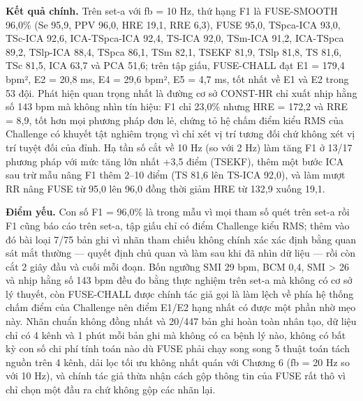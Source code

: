 \documentclass[12pt,a4paper]{article}
\begin{document}
\noindent \textbf{Kết quả chính.} Trên set-a với fb = 10 Hz, thứ hạng F1 là FUSE-SMOOTH 96,0\% (Se 95,9, PPV 96,0, HRE 19,1, RRE 6,3), FUSE 95,0, TSpca-ICA 93,0, TSc-ICA 92,6, ICA-TSpca-ICA 92,4, TS-ICA 92,0, TSm-ICA 91,2, ICA-TSpca 89,2, TSlp-ICA 88,4, TSpca 86,1, TSm 82,1, TSEKF 81,9, TSlp 81,8, TS 81,6, TSc 81,5, ICA 63,7 và PCA 51,6; trên tập giấu, FUSE-CHALL đạt E1 = 179,4 bpm², E2 = 20,8 ms, E4 = 29,6 bpm², E5 = 4,7 ms, tốt nhất về E1 và E2 trong 53 đội. Phát hiện quan trọng nhất là đường cơ sở CONST-HR chỉ xuất nhịp hằng số 143 bpm mà không nhìn tín hiệu: F1 chỉ 23,0\% nhưng HRE = 172,2 và RRE = 8,9, tốt hơn mọi phương pháp đơn lẻ, chứng tỏ hệ chấm điểm kiểu RMS của Challenge có khuyết tật nghiêm trọng vì chỉ xét vị trí tương đối chứ không xét vị trí tuyệt đối của đỉnh. Hạ tần số cắt về 10 Hz (so với 2 Hz) làm tăng F1 ở 13/17 phương pháp với mức tăng lớn nhất +3,5 điểm (TSEKF), thêm một bước ICA sau trừ mẫu nâng F1 thêm 2–10 điểm (TS 81,6 lên TS-ICA 92,0), và làm mượt RR nâng FUSE từ 95,0 lên 96,0 đồng thời giảm HRE từ 132,9 xuống 19,1.\par\vspace{3pt}
\noindent \textbf{Điểm yếu.} Con số F1 = 96,0\% là trong mẫu vì mọi tham số quét trên set-a rồi F1 cũng báo cáo trên set-a, tập giấu chỉ có điểm Challenge kiểu RMS; thêm vào đó bài loại 7/75 bản ghi vì nhãn tham chiếu không chính xác xác định bằng quan sát mắt thường — quyết định chủ quan và làm sau khi đã nhìn dữ liệu — rồi còn cắt 2 giây đầu và cuối mỗi đoạn. Bốn ngưỡng SMI 29 bpm, BCM 0,4, SMI > 26 và nhịp hằng số 143 bpm đều đo bằng thực nghiệm trên set-a mà không có cơ sở lý thuyết, còn FUSE-CHALL được chính tác giả gọi là làm lệch về phía hệ thống chấm điểm của Challenge nên điểm E1/E2 hạng nhất có được một phần nhờ mẹo này. Nhãn chuẩn không đồng nhất và 20/447 bản ghi hoàn toàn nhân tạo, dữ liệu chỉ có 4 kênh và 1 phút mỗi bản ghi mà không có ca bệnh lý nào, không có bất kỳ con số chi phí tính toán nào dù FUSE phải chạy song song 5 thuật toán tách nguồn trên 4 kênh, dải lọc tối ưu không nhất quán với Chương 6 (fb = 20 Hz so với 10 Hz), và chính tác giả thừa nhận cách gộp thông tin của FUSE rất thô vì chỉ chọn một đầu ra chứ không gộp các nhãn lại.\par\vspace{3pt}
\end{document}
